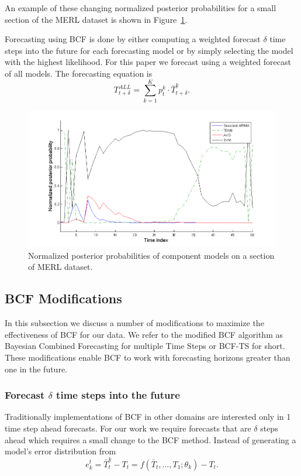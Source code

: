 \documentclass{acm_proc_article-sp}
\begin{document}
An example of these changing normalized posterior probabilities for a small section of the MERL dataset is shown in Figure~\ref{fig:probsmerl}.

Forecasting using BCF is done by either computing a weighted forecast $\delta$ time steps into the future for each forecasting model or by simply selecting the model with the highest likelihood.  For this paper we forecast using a weighted forecast of all models.  The forecasting equation is
\begin{equation}
T_{t + \delta}^{ALL} = \sum_{k=1}^{K}p_{t}^{k} \cdot \bar{T}_{t + \delta}^{k}.
\end{equation}

\begin{figure}
\centering
\includegraphics[width = 1.0\linewidth]{posterior_probs.png}
\caption{Normalized posterior probabilities of component models on a section of MERL dataset.}
\label{fig:probsmerl}
\end{figure}

\subsection{BCF Modifications}
In this subsection we discuss a number of modifications to maximize the effectiveness of BCF for our data.  We refer to the modified BCF algorithm as Bayesian Combined Forecasting for multiple Time Steps or BCF-TS for short.  These modifications  enable BCF to work with forecasting horizons greater than one in the future.

\subsubsection{Forecast $\delta$ time steps into the future}
Traditionally implementations of BCF in other domains \cite{Petridis2001, Zheng2006} are interested only in 1 time step ahead forecasts.  For our work we require forecasts that are $\delta$ steps ahead which requires a small change to the BCF method.  Instead of generating a model's error distribution from 
\begin{equation}
e^{t}_{k} = \bar{T}_{t}^{k} - T_{t} = f(\bar{T}_{t}, ..., T_{1}; \theta_{k}) - T_{t}.
\end{equation}
\end{document}
